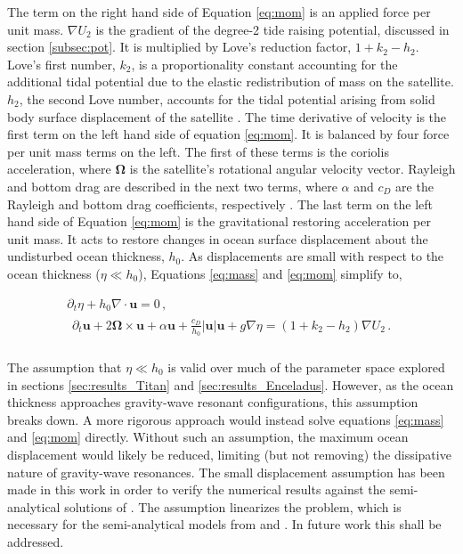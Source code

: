 The term on the right hand side of Equation \ref{eq:mom} is an applied force per unit mass. $\nabla U_2$ is the gradient of the degree-2 tide raising potential, discussed in section \ref{subsec:pot}. It is multiplied by Love's reduction factor, $1 + k_2 - h_2$. Love's first number, $k_2$, is a proportionality constant accounting for the additional tidal potential due to the elastic redistribution of mass on the satellite. $h_2$, the second Love number, accounts for the tidal potential arising from solid body surface displacement of the satellite \citep{love1911some}. The time derivative of velocity is the first term on the left hand side of equation  \ref{eq:mom}. It is balanced by four force per unit mass terms on the left. The first of these terms is the coriolis acceleration, where $\bm{\Omega}$ is the satellite's rotational angular velocity vector. Rayleigh and bottom drag are described in the next two terms, where $\alpha$ and $c_D$ are the Rayleigh and bottom drag coefficients, respectively \citep{sears1995tidal,chen2013tidal}. The last term on the left hand side of Equation \ref{eq:mom} is the gravitational restoring acceleration per unit mass. It acts to restore changes in ocean surface displacement about the undisturbed ocean thickness, $h_0$. As displacements are small with respect to the ocean thickness ($\eta \ll h_0$),  Equations \ref{eq:mass} and \ref{eq:mom} simplify to,  

\vspace{-0.5cm}
\begin{gather}
\partial_t \eta + h_0 \nabla \cdot \bm{u} = 0\, , \label{eq:mass_lin}\\
\begin{aligned} 
\partial_t \bm{u} + 2 \bm{\Omega} \times \bm{u} + \alpha\bm{u} + \frac{c_D}{h_0} \left|\bm{u}\right| \bm{u}  + g \nabla \eta = (1 + k_2 - h_2) \nabla U_2 \, . \label{eq:mom_lin}\\
\end{aligned} 
\end{gather}

\noindent The assumption that $\eta \ll h_0$ is valid over much of the parameter space explored in sections \ref{sec:results_Titan} and \ref{sec:results_Enceladus}. However, as the ocean thickness approaches gravity-wave resonant configurations, this assumption breaks down. A more rigorous approach would instead solve equations \ref{eq:mass} and \ref{eq:mom} directly. Without such an assumption, the maximum ocean displacement would likely be reduced, limiting (but not removing) the dissipative nature of gravity-wave resonances. The small displacement assumption has been made in this work in order to verify the numerical results against the semi-analytical solutions of \citet{matsuyama2014tidal}. The assumption linearizes the problem, which is necessary for the semi-analytical models from \citet{tyler2011tidal} and \citet{matsuyama2014tidal}. In future work this shall be addressed.

